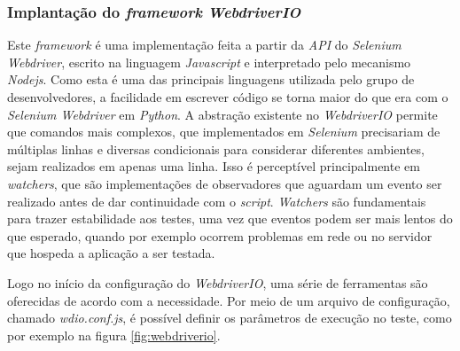 \hypertarget{implementacao-do-framework-webdriverio}{%
\subsubsection{\texorpdfstring{Implantação do \emph{framework} \emph{WebdriverIO}}{Implementação do framework WebdriverIO}}\label{implementacao-do-framework-webdriverio}}

Este \emph{framework} é uma implementação feita a partir da \emph{API} do \emph{Selenium Webdriver}, escrito na linguagem \emph{Javascript} e interpretado pelo mecanismo \emph{Nodejs}. Como esta é uma das principais linguagens utilizada pelo grupo de desenvolvedores, a facilidade em escrever código se torna maior do que era com o \emph{Selenium Webdriver} em \emph{Python}. A abstração existente no \emph{WebdriverIO} permite que comandos mais complexos, que implementados em \emph{Selenium} precisariam de múltiplas linhas e diversas condicionais para considerar diferentes ambientes, sejam realizados em apenas uma linha. Isso é perceptível principalmente em \emph{watchers}, que são implementações de observadores que aguardam um evento ser realizado antes de dar continuidade com o \emph{script}. \emph{Watchers} são fundamentais para trazer estabilidade aos testes, uma vez que eventos podem ser mais lentos do que esperado, quando por exemplo ocorrem problemas em rede ou no servidor que hospeda a aplicação a ser testada.

Logo no início da configuração do \emph{WebdriverIO}, uma série de ferramentas são oferecidas de acordo com a necessidade. Por meio de um arquivo de configuração, chamado \emph{wdio.conf.js}, é possível definir os parâmetros de execução no teste, como por exemplo na figura \ref{fig:webdriverio}.

